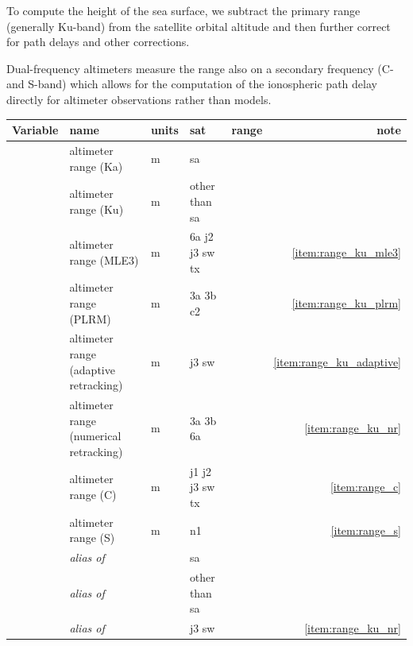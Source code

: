 \documentclass[a4paper,11pt,openany,natbib,nomargin]{thesis}
\newcommand\alias[1]{\emph{alias of} \var{#1}}
\newenvironment{vartable}{
\begin{table}[ht]
\small
\begin{tabular}{lllllr}
\hline\hline
Variable & name & units & sat & range & note \\
\hline\hline
}{
\hline
\end{tabular}
\end{table}
}
\begin{document}
To compute the height of the sea surface, we subtract the primary range (generally Ku-band) from the satellite orbital altitude and then further correct for path delays and other corrections.

Dual-frequency altimeters measure the range also on a secondary frequency (C- and S-band) which allows for the computation of the ionospheric path delay directly for altimeter observations rather than models.

\begin{vartable}
\var{range_ka} & altimeter range (Ka) & m & sa & & \\
\var{range_ku} & altimeter range (Ku) & m & other than sa & & \\
\var{range_ku_mle3} & altimeter range (MLE3) & m & 6a j2 j3 sw tx & & \ref{item:range_ku_mle3} \\
\var{range_ku_plrm} & altimeter range (PLRM) & m & 3a 3b c2 & & \ref{item:range_ku_plrm} \\
\var{range_ku_adaptive} & altimeter range (adaptive retracking) & m & j3 sw & & \ref{item:range_ku_adaptive} \\
\var{range_ku_nr} & altimeter range (numerical retracking) & m & 3a 3b 6a & & \ref{item:range_ku_nr} \\
\var{range_c}  & altimeter range (C) & m & j1 j2 j3 sw tx & & \ref{item:range_c} \\
\var{range_s}  & altimeter range (S) & m & n1 & & \ref{item:range_s} \\
\hline
\var{range} & \alias{range_ka} & & sa & & \\
\var{range} & \alias{range_ku} & & other than sa & & \\
\var{range_ku_nr} & \alias{range_ku_adaptive} & & j3 sw & & \ref{item:range_ku_nr} \\
\end{vartable}
\end{document}
